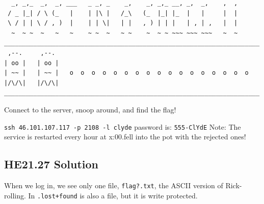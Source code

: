 \documentclass[english,a4paper,nols,noindent]{tufte-handout}
\begin{document}
{\footnotesize \begin{verbatim} 
  _, _,_  _,  _, ___   _ _, _    _,    _, _,_ __, _,  _,    ,  ,  
 / _ |_| / \ (_   |    | |\ |   /_\   (_  |_| |_  |   |     |  |  
 \ / | | \ / , )  |    | | \|   | |   , ) | | |   | , | ,   |  |  
  ~  ~ ~  ~   ~   ~    ~ ~  ~   ~ ~    ~  ~ ~ ~~~ ~~~ ~~~   ~  ~  
______________________________________________________________________  
 ,--.     ,--.    
| oo |   | oo |   
| ~~ |   | ~~ |   o  o  o  o  o  o  o  o  o  o  o  o  o  o  o  o  o  
|/\/\|   |/\/\|     
______________________________________________________________________  
\end{verbatim} 
}

\noindent Connect to the server, snoop around, and find the flag!

\verb+ssh 46.101.107.117 -p 2108 -l clyde+
password is: \verb+555-ClYdE+
Note: The service is restarted every hour at x:00.fell into the pot with the rejected ones!

\hypertarget{he21.27-solution}{%
\subsection{HE21.27 Solution}\label{he21.27-solution}}

\noindent When we log in, we see only one file, \verb+flag?.txt+, the ASCII version of Rick-rolling.  In \verb$.lost+found$ is also a file, but it is write protected.
\end{document}
